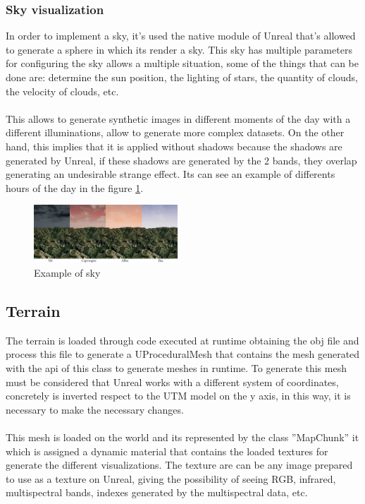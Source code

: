 \documentclass[10pt,a4paper,twocolumn,twoside]{article}
\begin{document}
\subsubsection{Sky visualization}
In order to implement a sky, it's used the native module of Unreal that's allowed to generate a sphere in which its render a sky. This sky has multiple parameters for configuring the sky allows a multiple situation, some of the things that can be done are: determine the sun position, the lighting of stars, the quantity of clouds, the velocity of clouds, etc.
\\\\
This allows to generate synthetic images in different moments of the day with a different illuminations, allow to generate more complex datasets. On the other hand, this implies that it is applied without shadows because the shadows are generated by Unreal, if these shadows are generated by the 2 bands, they overlap generating an undesirable strange effect. Its can see an example of differents hours of the day in the figure \ref{fig-sky}.

\begin{figure}[!h]
\centering
  	\includegraphics[width=0.48\textwidth]{sky/sky}
	\caption{Example of sky}
	\label{fig-sky}
\end{figure}

\subsection{Terrain}
The terrain is loaded through code executed at runtime obtaining the obj file and process this file to generate a UProceduralMesh\cite{uprocedural} that contains the mesh generated with the api of this class to generate meshes in runtime. To generate this mesh must be considered that Unreal works with a different system of coordinates, concretely is inverted respect to the UTM model on the y axis, in this way, it is necessary to make the necessary changes.
\\
\\
This mesh is loaded on the world and its represented by the class ''MapChunk'' it which is assigned a dynamic material that contains the loaded textures for generate the different visualizations. The texture are can be any image prepared to use as a texture on Unreal, giving the possibility of seeing RGB, infrared, multispectral bands, indexes generated by the multispectral data, etc.
\end{document}
